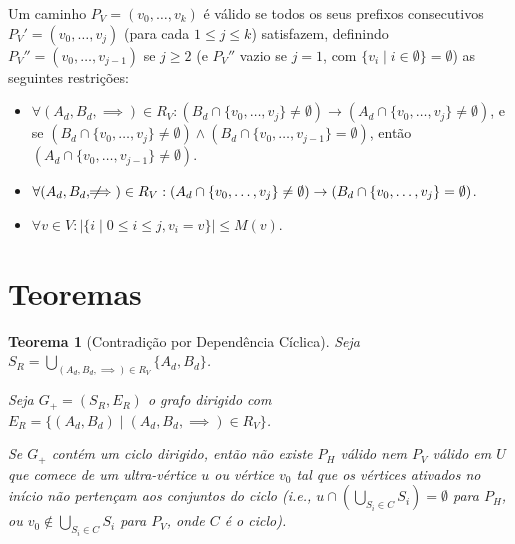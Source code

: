 \documentclass{article}
\newtheorem{theorem}{Teorema}
\begin{document}
Um caminho \( P_V = (v_0, \dots, v_k) \) é válido se todos os seus prefixos consecutivos \( P_V' = (v_0, \dots, v_j) \) (para cada \( 1 \leq j \leq k \)) satisfazem, definindo \( P_V'' = (v_0, \dots, v_{j-1}) \) se \( j \geq 2 \) (e \( P_V'' \) vazio se \( j = 1 \), com \( \{v_i \mid i \in \emptyset \} = \emptyset \)) as seguintes restrições:

\begin{itemize}
    \item \( \forall (A_d, B_d, \implies) \in R_V: (B_d \cap \{v_0, \dots, v_j\} \neq \emptyset) \to (A_d \cap \{v_0, \dots, v_j\} \neq \emptyset) \), e se \( (B_d \cap \{v_0, \dots, v_j\} \neq \emptyset) \wedge (B_d \cap \{v_0, \dots, v_{j-1}\} = \emptyset) \), então \( (A_d \cap \{v_0, \dots, v_{j-1}\} \neq \emptyset) \).
    \item \( \forall (A_d, B_d, \not\!\!\!\implies) \in R_V: (A_d \cap \{v_0, \dots, v_j\} \neq \emptyset) \to (B_d \cap \{v_0, \dots, v_j\} = \emptyset) \).
    \item \( \forall v \in V: |\{ i \mid 0 \leq i \leq j, v_i = v \}| \leq M(v) \).
\end{itemize}

\section{Teoremas}

\begin{theorem}[Contradição por Dependência Cíclica]
\hfill

Seja \( S_R = \bigcup_{(A_d, B_d, \implies) \in R_V} \{ A_d, B_d \} \).

Seja \( G_{+} = (S_R, E_R) \) o grafo dirigido com \( E_R = \{ (A_d, B_d) \mid (A_d, B_d, \implies) \in R_V \} \).

Se \( G_{+} \) contém um ciclo dirigido, então não existe \( P_H \) válido nem \( P_V \) válido em \( U \) que comece de um ultra-vértice \( u \) ou vértice \( v_0 \) tal que os vértices ativados no início não pertençam aos conjuntos do ciclo (i.e., \( u \cap \left( \bigcup_{S_i \in C} S_i \right) = \emptyset \) para \( P_H \), ou \( v_0 \notin \bigcup_{S_i \in C} S_i \) para \( P_V \), onde \( C \) é o ciclo).
\end{theorem}
\end{document}
